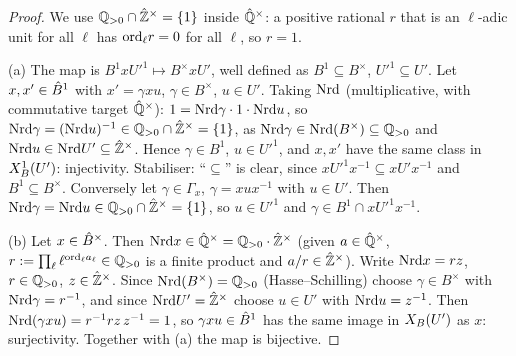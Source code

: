 \begin{proof}
We use $\mathbb{Q}_{>0}\cap\hat{\mathbb{Z}}^\times=\{1\}$ inside $\hat{\mathbb{Q}}^\times$: a positive rational $r$ that is an $\ell$-adic unit for all $\ell$ has
$\mathrm{ord}_\ell r=0$ for all $\ell$, so $r=1$.

(a) The map is $B^1xU'^1\mapsto B^\times xU'$, well defined as $B^1\subseteq B^\times$, $U'^1\subseteq U'$.
Let $x,x'\in\hat{B}^1$ with $x'=\gamma xu$, $\gamma\in B^\times$, $u\in U'$. Taking $\mathrm{Nrd}$ (multiplicative, with commutative target $\hat{\mathbb{Q}}^\times$):
$1=\mathrm{Nrd}\gamma\cdot1\cdot\mathrm{Nrd} u$, so $\mathrm{Nrd}\gamma=(\mathrm{Nrd} u)^{-1}\in\mathbb{Q}_{>0}\cap\hat{\mathbb{Z}}^\times=\{1\}$, as $\mathrm{Nrd}\gamma\in\mathrm{Nrd}(B^\times)\subseteq\mathbb{Q}_{>0}$ and
$\mathrm{Nrd} u\in\mathrm{Nrd} U'\subseteq\hat{\mathbb{Z}}^\times$. Hence $\gamma\in B^1$, $u\in U'^1$, and $x,x'$ have the same class in $X^1_B(U')$: injectivity.
Stabiliser: ``$\subseteq$'' is clear, since $xU'^1x^{-1}\subseteq xU'x^{-1}$ and $B^1\subseteq B^\times$. Conversely let $\gamma\in\Gamma_x$,
$\gamma=xux^{-1}$ with $u\in U'$. Then $\mathrm{Nrd}\gamma=\mathrm{Nrd} u\in\mathbb{Q}_{>0}\cap\hat{\mathbb{Z}}^\times=\{1\}$, so $u\in U'^1$ and $\gamma\in B^1\cap xU'^1x^{-1}$.

(b) Let $x\in\hat{B}^\times$. Then $\mathrm{Nrd} x\in\hat{\mathbb{Q}}^\times=\mathbb{Q}_{>0}\cdot\hat{\mathbb{Z}}^\times$ (given $a\in\hat{\mathbb{Q}}^\times$, $r:=\prod_\ell\ell^{\mathrm{ord}_\ell a_\ell}\in\mathbb{Q}_{>0}$ is a finite product
and $a/r\in\hat{\mathbb{Z}}^\times$). Write $\mathrm{Nrd} x=rz$, $r\in\mathbb{Q}_{>0}$, $z\in\hat{\mathbb{Z}}^\times$. Since $\mathrm{Nrd}(B^\times)=\mathbb{Q}_{>0}$
(Hasse--Schilling) choose $\gamma\in B^\times$ with $\mathrm{Nrd}\gamma=r^{-1}$, and since $\mathrm{Nrd} U'=\hat{\mathbb{Z}}^\times$ choose $u\in U'$ with $\mathrm{Nrd} u=z^{-1}$.
Then $\mathrm{Nrd}(\gamma xu)=r^{-1}rz\,z^{-1}=1$, so $\gamma xu\in\hat{B}^1$ has the same image in $X_B(U')$ as $x$: surjectivity.
Together with (a) the map is bijective.
\end{proof}
